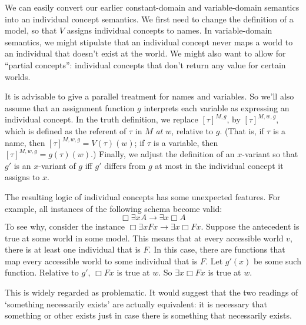 We can easily convert our earlier constant-domain and variable-domain semantics
into an individual concept semantics. We first need  to change the definition of a
model, so that $V$ assigns individual concepts to names. In variable-domain
semantics, we might stipulate that an individual concept never maps a world to
an individual that doesn't exist at the world. We might also want to allow for
``partial concepts'': individual concepts that don't return any value for
certain worlds.

It is advisable to give a parallel treatment for names and variables. So we'll
also assume that an assignment function $g$ interprets each variable as
expressing an individual concept. In the truth definition, we replace
$[\tau]^{M,g}$, by $[\tau]^{M,w,g}$, which is defined as the referent of $\tau$
in $M$ \emph{at $w$}, relative to $g$. (That is, if $\tau$ is a name, then
$[\tau]^{M,w,g} = V(\tau)(w)$; if $\tau$ is a variable, then
$[\tau]^{M,w,g} = g(\tau)(w)$.) Finally, we adjust the definition of an
$x$-variant so that $g'$ is an $x$-variant of $g$ iff $g'$ differs from $g$ at
most in the individual concept it assigns to $x$.

The resulting logic of individual concepts has some unexpected features. For
example, all instances of the following schema become valid:
\[
  \Box \exists x A \to \exists x \Box A
\]
To see why, consider the instance $\Box \exists x Fx \to \exists x \Box Fx$.
Suppose the antecedent is true at some world in some model. This means that at
every accessible world $v$, there is at least one individual that is $F$. In
this case, there are functions that map every accessible world to some
individual that is $F$. Let $g'(x)$ be some such function. Relative to $g'$,
$\Box Fx$ is true at $w$. So $\exists x \Box Fx$ is true at $w$.

This is widely regarded as problematic. It would suggest that the two readings
of `something necessarily exists' are actually equivalent: it is necessary that
something or other exists just in case there is something that necessarily
exists.


